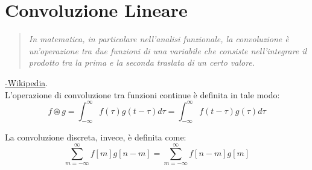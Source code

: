 \section{Convoluzione Lineare}

\begin{quote}
	\emph{In matematica, in particolare nell'analisi funzionale, la convoluzione è un'operazione tra due funzioni di una variabile che consiste nell'integrare il prodotto tra la prima e la seconda traslata di un certo valore. }
\end{quote}
\hspace*{\fill} \href{https://it.wikipedia.org/wiki/Convoluzione}{-Wikipedia}. \\

L'operazione di convoluzione tra funzioni continue è definita in tale modo:
\begin{equation}
	f \circledast g = \int^{\infty}_{- \infty} f(\tau)g(t-\tau)d\tau = \int^{\infty}_{- \infty} f(t - \tau)g(\tau)d\tau
\end{equation}

La convoluzione discreta, invece, è definita come:
\begin{equation}
	\sum^{\infty}_{m= - \infty} f[m]g[n-m] = \sum^{\infty}_{m= - \infty} f[n-m]g[m] 
\end{equation}
